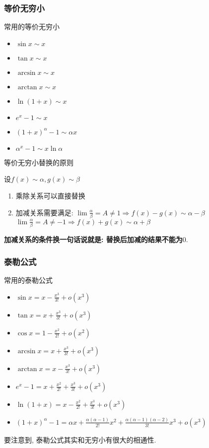 \subsubsection{等价无穷小}
{\kaishu 常用的等价无穷小}\vspace{-1em}
\begin{multicols}{2}
\begin{itemize}
\item $ \sin x\sim x $
\item $ \tan x\sim x $
\item $ \arcsin x\sim x $
\item $ \arctan x\sim x $
\item $ \ln(1+x)\sim x $
\item $ e^{x}-1\sim x $
\item $ (1+x)^{\alpha}-1\sim \alpha x $
\item $ \alpha^{x}-1\sim x\ln \alpha $
\end{itemize}
\end{multicols}
{\kaishu 等价无穷小替换的原则}\par \vspace{.5em}
设$ f(x)\sim \alpha, g(x)\sim \beta $
\begin{enumerate}
\item 乘除关系可以直接替换
\item 加减关系需要满足:
\subitem $ \lim\limits \frac{\alpha}{\beta}=A\neq 1\Rightarrow f(x)-g(x)\sim \alpha-\beta $
\subitem $ \lim\limits \frac{\alpha}{\beta}=A\neq -1\Rightarrow f(x)+g(x)\sim \alpha+\beta $
\end{enumerate}\par
\textbf{加减关系的条件换一句话说就是: 替换后加减的结果不能为$ 0 $}.
\subsubsection{泰勒公式}
{\kaishu 常用的泰勒公式}\vspace{-1em}
\begin{multicols}{2}
\begin{itemize}
\item $ \sin x=x-\frac{x^{3}}{3!}+o(x^{3}) $
\item $ \tan x=x+\frac{x^{3}}{3!}+o(x^{3}) $
\item $ \cos x=1-\frac{x^{2}}{2!}+o(x^{2}) $
\item $ \arcsin x=x+\frac{x^{3}}{3!}+o(x^{3}) $
\item $ \arctan x=x-\frac{x^{3}}{3!}+o(x^{3}) $
\item $ e^{x}-1=x+\frac{x^{2}}{2!}+\frac{x^{3}}{3!}+o(x^{3}) $
\item $ \ln(1+x)=x-\frac{x^{2}}{2!}+\frac{x^{3}}{3!}+o(x^{3}) $
\item $ (1+x)^{\alpha}-1=\alpha x+\frac{\alpha(\alpha-1)}{2!}x^{2}+\frac{\alpha(\alpha-1)(\alpha-2)}{3!}x^{3}+o(x^{3}) $
\end{itemize}
\end{multicols}\par
要注意到, 泰勒公式其实和无穷小有很大的相通性.
